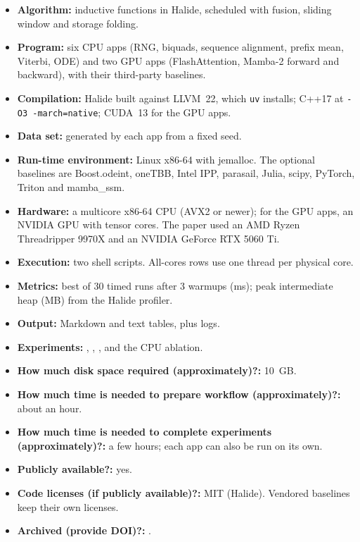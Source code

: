 {\small
\begin{itemize}
  \item {\bf Algorithm:} inductive functions in Halide, scheduled with fusion,
    sliding window and storage folding.
  \item {\bf Program:} six CPU apps (RNG, biquads, sequence alignment, prefix
    mean, Viterbi, ODE) and two GPU apps (FlashAttention, Mamba-2 forward
    and backward), with their third-party baselines.
  \item {\bf Compilation:} Halide built against LLVM~22, which \texttt{uv}
    installs; C++17 at \texttt{-O3 -march=native}; CUDA~13 for the GPU apps.
  \item {\bf Data set:} generated by each app from a fixed seed.
  \item {\bf Run-time environment:} Linux x86-64 with jemalloc. The optional
    baselines are Boost.odeint, oneTBB, Intel IPP, parasail, Julia, scipy,
    PyTorch, Triton and mamba\_ssm.
  \item {\bf Hardware:} a multicore x86-64 CPU (AVX2 or newer); for the
    GPU apps, an NVIDIA GPU with tensor cores. The paper used an AMD Ryzen
    Threadripper 9970X and an NVIDIA GeForce RTX 5060 Ti.
  \item {\bf Execution:} two shell scripts. All-cores rows use one thread
    per physical core.
  \item {\bf Metrics:} best of 30 timed runs after 3 warmups (ms); peak
    intermediate heap (MB) from the Halide profiler.
  \item {\bf Output:} Markdown and text tables, plus logs.
  \item {\bf Experiments:} ,
    , , and
    the CPU ablation.
  \item {\bf How much disk space required (approximately)?:} 10~GB.
  \item {\bf How much time is needed to prepare workflow (approximately)?:}
    about an hour.
  \item {\bf How much time is needed to complete experiments (approximately)?:}
    a few hours; each app can also be run on its own.
  \item {\bf Publicly available?:} yes.
  \item {\bf Code licenses (if publicly available)?:} MIT (Halide). Vendored
    baselines keep their own licenses.
  \item {\bf Archived (provide DOI)?:} \artifactdoi.
\end{itemize}
}

